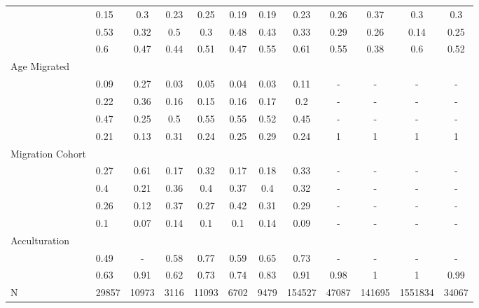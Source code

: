 \begin{table}[ht]
\begin{tabular}{>{\raggedright\arraybackslash}p{3.2cm}|lcccccc|cccc}
  \multicolumn{1}{>{\raggedleft\arraybackslash}p{2.2cm}|}{\makebox[2.2cm][r]{Lives Alone }}& 0.15 & 0.3 & 0.23 & 0.25 & 0.19 & 0.19 & 0.23 & 0.26 & 0.37 & 0.3 & 0.3 \\ 
  \multicolumn{1}{>{\raggedleft\arraybackslash}p{2.9cm}|}{\makebox[2.9cm][r]{Lives with Child }}& 0.53 & 0.32 & 0.5 & 0.3 & 0.48 & 0.43 & 0.33 & 0.29 & 0.26 & 0.14 & 0.25 \\ 
  \multicolumn{1}{>{\raggedleft\arraybackslash}p{3.4cm}|}{\makebox[3.4cm][r]{Married/Cohabiting }}& 0.6 & 0.47 & 0.44 & 0.51 & 0.47 & 0.55 & 0.61 & 0.55 & 0.38 & 0.6 & 0.52 \\ 
  Age Migrated &  &  &  &  &  &  &  &  &  &  &  \\ 
  \multicolumn{1}{>{\raggedleft\arraybackslash}p{2.4cm}|}{\makebox[2.4cm][r]{Less than 15 }}& 0.09 & 0.27 & 0.03 & 0.05 & 0.04 & 0.03 & 0.11 & - & - & - & - \\ 
  \multicolumn{1}{>{\raggedleft\arraybackslash}p{1.6cm}|}{\makebox[1.6cm][r]{15 - 24 }}& 0.22 & 0.36 & 0.16 & 0.15 & 0.16 & 0.17 & 0.2 & - & - & - & - \\ 
  \multicolumn{1}{>{\raggedleft\arraybackslash}p{1.6cm}|}{\makebox[1.6cm][r]{25 - 49 }}& 0.47 & 0.25 & 0.5 & 0.55 & 0.55 & 0.52 & 0.45 & - & - & - & - \\ 
  \multicolumn{1}{>{\raggedleft\arraybackslash}p{2.6cm}|}{\makebox[2.6cm][r]{50 and Above }}& 0.21 & 0.13 & 0.31 & 0.24 & 0.25 & 0.29 & 0.24 & 1 & 1 & 1 & 1 \\ 
  Migration Cohort &  &  &  &  &  &  &  &  &  &  &  \\ 
  \multicolumn{1}{>{\raggedleft\arraybackslash}p{2.3cm}|}{\makebox[2.3cm][r]{Before 1965 }}& 0.27 & 0.61 & 0.17 & 0.32 & 0.17 & 0.18 & 0.33 & - & - & - & - \\ 
  \multicolumn{1}{>{\raggedleft\arraybackslash}p{2.2cm}|}{\makebox[2.2cm][r]{1965 - 1979 }}& 0.4 & 0.21 & 0.36 & 0.4 & 0.37 & 0.4 & 0.32 & - & - & - & - \\ 
  \multicolumn{1}{>{\raggedleft\arraybackslash}p{2.2cm}|}{\makebox[2.2cm][r]{1980 - 1999 }}& 0.26 & 0.12 & 0.37 & 0.27 & 0.42 & 0.31 & 0.29 & - & - & - & - \\ 
  \multicolumn{1}{>{\raggedleft\arraybackslash}p{2.1cm}|}{\makebox[2.1cm][r]{After 1999 }}& 0.1 & 0.07 & 0.14 & 0.1 & 0.1 & 0.14 & 0.09 & - & - & - & - \\ 
  Acculturation &  &  &  &  &  &  &  &  &  &  &  \\ 
  \multicolumn{1}{>{\raggedleft\arraybackslash}p{1.6cm}|}{\makebox[1.6cm][r]{Citizen }}& 0.49 & - & 0.58 & 0.77 & 0.59 & 0.65 & 0.73 & - & - & - & - \\ 
  \multicolumn{1}{>{\raggedleft\arraybackslash}p{3cm}|}{\makebox[3cm][r]{English Speakers }}& 0.63 & 0.91 & 0.62 & 0.73 & 0.74 & 0.83 & 0.91 & 0.98 & 1 & 1 & 0.99 \\ 
  N & 29857 & 10973 & 3116 & 11093 & 6702 & 9479 & 154527 & 47087 & 141695 & 1551834 & 34067 \\ 
   \hline
\end{tabular}
\endgroup
\end{table}
